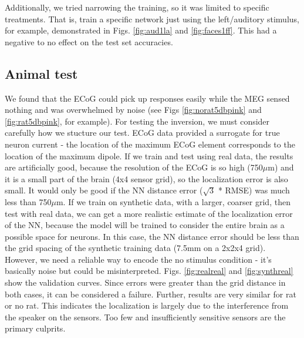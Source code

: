 \documentclass[journal,12pt,onecolumn,draftclsnofoot]{IEEEtran}
\begin{document}
Additionally, we tried narrowing the training, so it was limited to specific treatments. That is, train a specific network just using the left/auditory stimulus, for example, demonstrated in Figs. \ref{fig:aud1la} and \ref{fig:faces1ff}. This had a negative to no effect on the test set accuracies.

\subsection{Animal test}

We found that the ECoG could pick up responses easily while the MEG sensed nothing and was overwhelmed by noise (see Figs \ref{fig:norat5dbpink} and \ref{fig:rat5dbpink}, for example). For testing the inversion, we must consider carefully how we stucture our test. ECoG data provided a surrogate for true neuron current - the location of the maximum ECoG element corresponds to the location of the maximum dipole. If we train and test using real data, the results are artificially good, because the resolution of the ECoG is so high (750$\mu$m) and it is a small part of the brain (4x4 sensor grid), so the localization error is also small. It would only be good if the NN distance error ($\sqrt{3}$ * RMSE) was much less than 750$\mu$m. If we train on synthetic data, with a larger, coarser grid, then test with real data, we can get a more realistic estimate of the localization error of the NN, because the model will be trained to consider the entire brain as a possible space for neurons. In this case, the NN distance error should be less than the grid spacing of the synthetic training data (7.5mm on a 2x2x4 grid). However, we need a reliable way to encode the no stimulus condition - it’s basically noise but could be misinterpreted. Figs. \ref{fig:realreal} and \ref{fig:synthreal} show the validation curves. Since errors were greater than the grid distance in both cases, it can be considered a failure. Further, results are very similar for rat or no rat. This indicates the localization is largely due to the interference from the speaker on the sensors. Too few and insufficiently sensitive sensors are the primary culprits.
\end{document}
